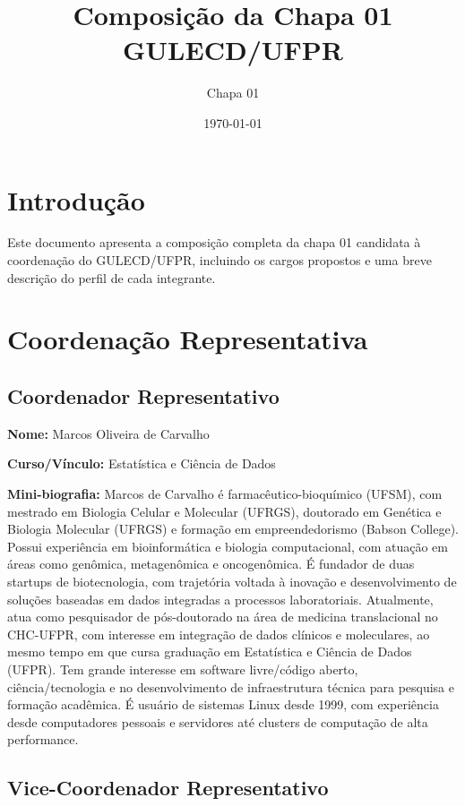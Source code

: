 \documentclass[11pt,a4paper]{article}
\title{\textbf{Composição da Chapa 01 \\ GULECD/UFPR}}
\author{Chapa 01}
\date{\today}
\begin{document}
\maketitle

\section{Introdução}

Este documento apresenta a composição completa da chapa 01 candidata à coordenação do GULECD/UFPR, incluindo os cargos propostos e uma breve descrição do perfil de cada integrante.

\section{Coordenação Representativa}

\subsection{Coordenador Representativo}

\textbf{Nome:} Marcos Oliveira de Carvalho

\textbf{Curso/Vínculo:} Estatística e Ciência de Dados

\textbf{Mini-biografia:}  
Marcos de Carvalho é farmacêutico-bioquímico (UFSM), com mestrado em Biologia Celular e Molecular (UFRGS), doutorado em Genética e Biologia Molecular (UFRGS) e formação em empreendedorismo (Babson College). Possui experiência em bioinformática e biologia computacional, com atuação em áreas como genômica, metagenômica e oncogenômica. É fundador de duas startups de biotecnologia, com trajetória voltada à inovação e desenvolvimento de soluções baseadas em dados integradas a processos laboratoriais. Atualmente, atua como pesquisador de pós-doutorado na área de medicina translacional no CHC-UFPR, com interesse em integração de dados clínicos e moleculares, ao mesmo tempo em que cursa graduação em Estatística e Ciência de Dados (UFPR). Tem grande interesse em software livre/código aberto, ciência/tecnologia e no desenvolvimento de infraestrutura técnica para pesquisa e formação acadêmica. É usuário de sistemas Linux desde 1999, com experiência desde computadores pessoais e servidores até clusters de computação de alta performance.

\vspace{1em}

\subsection{Vice-Coordenador Representativo}
\end{document}
